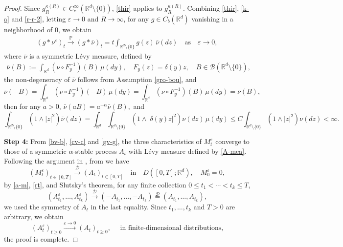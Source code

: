 \documentclass[11pt,reqno]{amsart}
\numberwithin{equation}{section}
\begin{document}
\begin{proof}
Since $g_R^{\kappa(R)}\in
C_c^\infty(\mathbb R^d\setminus\{0\})$, \eqref{thir} applies to
$g_R^{\kappa(R)}$.  Combining \eqref{thir}, \eqref{k-a} and \eqref{r-r-2},
letting $\varepsilon\to 0$ and $R\to\infty$, for any
$g\in C_b(\mathbb R^d)$ vanishing in a neighborhood of  $0$, we obtain 
\begin{align}\label{gv-g}
	(g*\nu^\varepsilon)_t
	\xrightarrow{\mathbb P}
	(g*\bar\nu)_t=t\int_{\mathbb R^d\setminus\{0\}}
	g(z)\,\bar\nu(dz) \quad \text{as}\quad \varepsilon\to 0,
\end{align}
where $\bar{\nu}$ is a symmetric L\'evy measure, defined by
\begin{align}\label{A-mea}
	\bar\nu(B):=\int_{\mathbb R^d}
	\left(\nu\circ F_y^{-1}\right)(B)\,\mu(dy),\quad F_y(z)=\delta(y)z,\quad B\in\mathcal{B}(\mathbb{R}^d\setminus\{0\}),
\end{align}
 the non-degeneracy of $\bar{\nu}$ follows from Assumption \ref{gro-bou}, %
 and $$\bar{\nu}(-B)
=\int_{\mathbb{R}^d}(\nu\circ F_y^{-1})(-B)\,\mu(dy)
=\int_{\mathbb{R}^d}(\nu\circ F_y^{-1})(B)\,\mu(dy)
=\bar{\nu}(B),$$ then for any $a>0$, $\bar\nu(aB)=a^{-\alpha}\bar\nu(B),$  and %
$$
\int_{\mathbb{R}^d\setminus\{0\}}(1\wedge |z|^2)\bar{\nu}(dz)
=\int_{\mathbb{R}^d}\int_{\mathbb{R}^d\setminus\{0\}}
(1\wedge|\delta(y)z|^2)\nu(dz)\,\mu(dy)
\leq C\int_{\mathbb{R}^d\setminus\{0\}}(1\wedge|z|^2)\nu(dz)<\infty.
$$



\textbf{Step 4:}
From \eqref{bv-b}, \eqref{cv-c} and \eqref{gv-g}, the three
characteristics of $M^\varepsilon_{t}$ converge to those
of a symmetric $\alpha$-stable process $A_{t}$ with Lévy measure
defined by \eqref{A-mea}.  %
Following the argument in \cite[p.1094, Theorem 1]{BF},  from \cite[p.459, Theorem 1.18]{JS} we have
$$
(M^\varepsilon_{t})_{t\in [0,T]} \xrightarrow{\mathcal D} (A_{t})_{t\in [0,T]}
\quad\text{in}\quad D([0,T];\mathbb R^d), \quad M^\varepsilon_{0}=0,
$$
by \eqref{a-m}, \eqref{rt}, and Slutsky's theorem, for
any finite collection 
$0\leq t_1<\cdots<t_k\leq T$, 
\[
(A_{t_1}^\varepsilon,\ldots,A_{t_k}^\varepsilon)
\xrightarrow{\mathcal D}
(-A_{t_1},\ldots,-A_{t_k})
\overset{\mathcal D}{=}
(A_{t_1},\ldots,A_{t_k}),
\]
we used  the symmetry of  $A_{t}$ in the last equality. Since $t_1,\ldots,t_k$ and $T>0$ are arbitrary,
we obtain
\[
(A^\varepsilon_t)_{t\geq0}\xrightarrow{\varepsilon\to 0}(A_t)_{t\geq0}, \quad   \text{ in finite-dimensional distributions,}
\]
the  proof is complete.
\end{proof}
\end{document}
